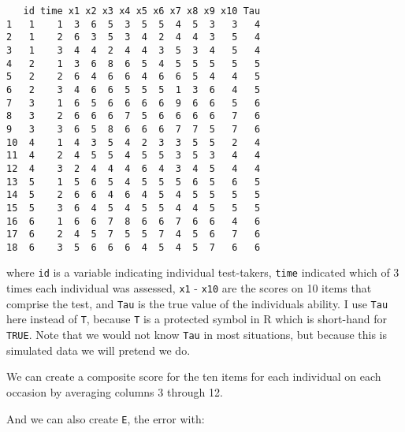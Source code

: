 \documentclass[
]{book}
\newenvironment{Shaded}{\begin{snugshade}}{\end{snugshade}}
\newcommand{\DecValTok}[1]{\textcolor[rgb]{0.00,0.00,0.81}{#1}}
\newcommand{\FunctionTok}[1]{\textcolor[rgb]{0.00,0.00,0.00}{#1}}
\newcommand{\NormalTok}[1]{#1}
\newcommand{\OtherTok}[1]{\textcolor[rgb]{0.56,0.35,0.01}{#1}}
\newcommand{\SpecialCharTok}[1]{\textcolor[rgb]{0.00,0.00,0.00}{#1}}
\begin{document}
\begin{verbatim}
   id time x1 x2 x3 x4 x5 x6 x7 x8 x9 x10 Tau
1   1    1  3  6  5  3  5  5  4  5  3   3   4
2   1    2  6  3  5  3  4  2  4  4  3   5   4
3   1    3  4  4  2  4  4  3  5  3  4   5   4
4   2    1  3  6  8  6  5  4  5  5  5   5   5
5   2    2  6  4  6  6  4  6  6  5  4   4   5
6   2    3  4  6  6  5  5  5  1  3  6   4   5
7   3    1  6  5  6  6  6  6  9  6  6   5   6
8   3    2  6  6  6  7  5  6  6  6  6   7   6
9   3    3  6  5  8  6  6  6  7  7  5   7   6
10  4    1  4  3  5  4  2  3  3  5  5   2   4
11  4    2  4  5  5  4  5  5  3  5  3   4   4
12  4    3  2  4  4  4  6  4  3  4  5   4   4
13  5    1  5  6  5  4  5  5  5  6  5   6   5
14  5    2  6  6  4  6  4  5  4  5  5   5   5
15  5    3  6  4  5  4  5  5  4  4  5   5   5
16  6    1  6  6  7  8  6  6  7  6  6   4   6
17  6    2  4  5  7  5  5  7  4  5  6   7   6
18  6    3  5  6  6  6  4  5  4  5  7   6   6
\end{verbatim}

where \texttt{id} is a variable indicating individual test-takers, \texttt{time} indicated which of 3 times each individual was assessed, \texttt{x1} - \texttt{x10} are the scores on 10 items that comprise the test, and \texttt{Tau} is the true value of the individuals ability.
I use \texttt{Tau} here instead of \texttt{T}, because \texttt{T} is a protected symbol in R which is short-hand for \texttt{TRUE}.
Note that we would not know \texttt{Tau} in most situations, but because this is simulated data we will pretend we do.

We can create a composite score for the ten items for each individual on each occasion by averaging columns 3 through 12.

\begin{Shaded}
\end{Shaded}

And we can also create \texttt{E}, the error with:

\begin{Shaded}
\end{Shaded}
\end{document}
